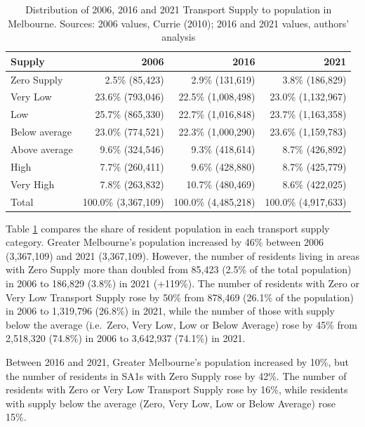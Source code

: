 \documentclass[preprint, 3p,
authoryear]{elsarticle} %
\begin{document}
\begin{table}

\caption{\label{tab:Greater_Melbourne_CCDs_SA1_population}Distribution of 2006, 2016 and 2021 Transport Supply to population in Melbourne. Sources: 2006 values, Currie (2010); 2016 and 2021 values, authors' analysis}
\centering
\begin{tabular}[t]{l|r|r|r}
\hline
Supply & 2006 & 2016 & 2021\\
\hline
Zero Supply & 2.5\%    (85,423) & 2.9\%   (131,619) & 3.8\%   (186,829)\\
\hline
Very Low & 23.6\%   (793,046) & 22.5\% (1,008,498) & 23.0\% (1,132,967)\\
\hline
Low & 25.7\%   (865,330) & 22.7\% (1,016,848) & 23.7\% (1,163,358)\\
\hline
Below average & 23.0\%   (774,521) & 22.3\% (1,000,290) & 23.6\% (1,159,783)\\
\hline
Above average & 9.6\%   (324,546) & 9.3\%   (418,614) & 8.7\%   (426,892)\\
\hline
High & 7.7\%   (260,411) & 9.6\%   (428,880) & 8.7\%   (425,779)\\
\hline
Very High & 7.8\%   (263,832) & 10.7\%   (480,469) & 8.6\%   (422,025)\\
\hline
Total & 100.0\% (3,367,109) & 100.0\% (4,485,218) & 100.0\% (4,917,633)\\
\hline
\end{tabular}
\end{table}

Table \ref{tab:Greater_Melbourne_CCDs_SA1_population} compares the share
of resident population in each transport supply category. Greater
Melbourne's population increased by 46\% between 2006 (3,367,109) and
2021 (3,367,109). However, the number of residents living in areas with
Zero Supply more than doubled from 85,423 (2.5\% of the total
population) in 2006 to 186,829 (3.8\%) in 2021 (+119\%). The number of
residents with Zero or Very Low Transport Supply rose by 50\% from
878,469 (26.1\% of the population) in 2006 to 1,319,796 (26.8\%) in
2021, while the number of those with supply below the average
(i.e.~Zero, Very Low, Low or Below Average) rose by 45\% from 2,518,320
(74.8\%) in 2006 to 3,642,937 (74.1\%) in 2021.

Between 2016 and 2021, Greater Melbourne's population increased by 10\%,
but the number of residents in SA1s with Zero Supply rose by 42\%. The
number of residents with Zero or Very Low Transport Supply rose by 16\%,
while residents with supply below the average (Zero, Very Low, Low or
Below Average) rose 15\%.
\end{document}

